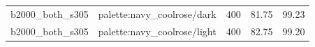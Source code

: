 \begin{longtable}{l>{\raggedright\arraybackslash}p{.42\linewidth}rrr}
b2000\_\allowbreak{}both\_\allowbreak{}s305 & %
palette:navy\_\allowbreak{}coolrose/dark & %
400 & %
81.75 & %
99.23 \\ %

b2000\_\allowbreak{}both\_\allowbreak{}s305 & %
palette:navy\_\allowbreak{}coolrose/light & %
400 & %
82.75 & %
99.20 \\ %


\end{longtable}
